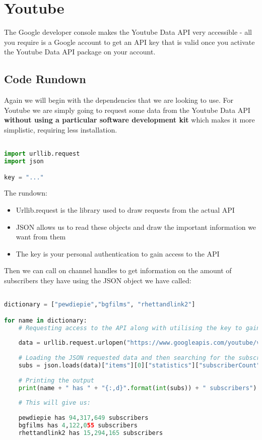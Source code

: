 \documentclass[12pt, letterpaper]{article}
\begin{document}
\newpage
\section{Youtube}
The Google developer console makes the Youtube Data API very accessible - all you require is a Google account to get an API key that is valid once you activate the Youtube Data API package on your account.
\subsection{Code Rundown}
Again we will begin with the dependencies that we are looking to use. For Youtube we are simply going to request some data from the Youtube Data API \textbf{without using a particular software development kit} which makes it more simplistic, requiring less installation.

\begin{lstlisting}[language=python]

import urllib.request
import json

key = "..."
\end{lstlisting}

The rundown:
\begin{itemize}
	\item Urllib.request is the library used to draw requests from the actual API
	\item JSON allows us to read these objects and draw the important information we want from them
	\item The key is your personal authentication to gain access to the API
\end{itemize}

Then we can call on channel handles to get information on the amount of subscribers they have using the JSON object we have called:

\begin{lstlisting}[language=python]

dictionary = ["pewdiepie","bgfilms", "rhettandlink2"]

for name in dictionary:
	# Requesting access to the API along with utilising the key to gain access
    
    data = urllib.request.urlopen("https://www.googleapis.com/youtube/v3/channels?part=statistics&forUsername="+name+"&key="+key).read()
    
    # Loading the JSON requested data and then searching for the subscriber count
    subs = json.loads(data)["items"][0]["statistics"]["subscriberCount"]
   
    # Printing the output
    print(name + " has " + "{:,d}".format(int(subs)) + " subscribers")
    
    # This will give us:
   
    pewdiepie has 94,317,649 subscribers
	bgfilms has 4,122,055 subscribers
	rhettandlink2 has 15,294,165 subscribers
    
\end{lstlisting}
\end{document}
